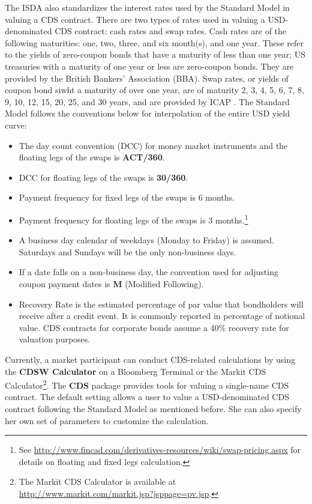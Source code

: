 \documentclass{jss}
\begin{document}
The ISDA also standardizes the interest rates used by the Standard Model in valuing a CDS contract. There are two types of rates used in valuing a USD-denominated CDS contract: cash rates and swap rates. Cash rates are of the following maturities: one, two, three, and six month(s), and one year. These refer to the yields of zero-coupon bonds that have a maturity of less than one year; US treasuries with a maturity of one year or less are zero-coupon bonds. They are provided by the British Bankers' Association (BBA). Swap rates, or yields of coupon bond siwht a maturity of over one year, are of maturity 2, 3, 4, 5, 6, 7, 8, 9, 10, 12, 15, 20, 25, and 30 years, and are provided by ICAP \citep{rates}. The Standard Model follows the conventions below for interpolation of the entire USD yield curve:
\begin{itemize}
\item The day count convention (DCC) for money market instruments and
  the floating legs of the swaps is \textbf{ACT/360}.
\item DCC for floating legs of the swaps is \textbf{30/360}.
\item Payment frequency for fixed legs of the swaps is 6 months.
\item Payment frequency for floating legs of the swaps is 3
  months.\footnote{See
    \url{http://www.fincad.com/derivatives-resources/wiki/swap-pricing.aspx}
    for details on floating and fixed legs calculation.}
\item A business day calendar of weekdays (Monday to Friday) is
  assumed. Saturdays and Sundays will be the only non-business days.
\item If a date falls on a non-business day, the convention used for
  adjusting coupon payment dates is \textbf{M} (Modified Following).
\item Recovery Rate is the estimated percentage of par value that
  bondholders will receive after a credit event. It is commonly
  reported in percentage of notional value. CDS contracts for corporate bonds
  assume a 40\% recovery rate for valuation purposes. 
\end{itemize}


Currently, a market participant can conduct CDS-related calculations by using the \textbf{CDSW Calculator} on a Bloomberg Terminal or the Markit CDS Calculator\footnote{The Markit CDS Calculator is available
  at \url{http://www.markit.com/markit.jsp?jsppage=pv.jsp}.}. The \textbf{CDS} package provides tools for valuing a single-name CDS contract. The default setting allows a user to value a USD-denominated CDS contract following the Standard Model as mentioned before. She can also specify her own set of parameters to customize the calculation. 
\end{document}
